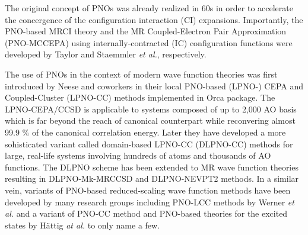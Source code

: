 \documentclass[aip,jcp,amsmath]{revtex4-1}
\begin{document}
%
The original concept of PNOs was already realized in 60s in order to accelerate the concergence of the configuration interaction (CI) expansions.\cite{:/content/aip/journal/jcp/40/12/10.1063/1.1725065,:/content/aip/journal/jcp/48/4/10.1063/1.1668917,:/content/aip/journal/jcp/42/3/10.1063/1.1696050,:/content/aip/journal/jcp/45/5/10.1063/1.1727841,meyer1971ionization,:/content/aip/journal/jcp/58/3/10.1063/1.1679283,meyer1971ionization,Ahlrichs1968_2}
%
Importantly, the PNO-based MRCI theory and the MR Coupled-Electron Pair Approximation (PNO-MCCEPA) using internally-contracted (IC) configuration functions were developed by Taylor\cite{:/content/aip/journal/jcp/74/2/10.1063/1.441186} and Staemmler {\it et al.},\cite{Staemmler1993} respectively.

%
The use of PNOs in the context of modern wave function theories was first introduced by Neese and coworkers in their local PNO-based (LPNO-) CEPA\cite{neeseefficient2009cepa} and Coupled-Cluster (LPNO-CC)\cite{neeseefficient2009,hansenefficient2011,doi:10.1021/ct100445s} methods implemented in Orca package.\cite{WCMS:WCMS1327}
%
The LPNO-CEPA/CCSD is applicable to systems composed of up to 2,000 AO basis which is far beyond the reach of canonical counterpart while reconvering almost 99.9 $\%$ of the canonical correlation energy.
%
Later they have developed a more sohisticated variant called domain-based LPNO-CC (DLPNO-CC) methods for large, real-life systems involving hundreds of atoms and thousands of AO functions.\cite{riplingeran2013,riplingernatural2013,pinskisparse2015,riplingersparse2016,doi:10.1063/1.4981521,dipayan2016}
%
The DLPNO scheme has been extended to MR wave function theories resulting in DLPNO-Mk-MRCCSD\cite{doi:10.1021/acs.jctc.5b00334,doi:10.1021/acs.jctc.7b01184,C8CP03577F} and DLPNO-NEVPT2\cite{:/content/aip/journal/jcp/144/9/10.1063/1.4942769} methods.
%
In a similar vein, variants of PNO-based reduced-scaling wave function methods have been developed by many research groups including PNO-LCC methods by Werner {\it et al.}\cite{doi:10.1021/ct500725e,wernersdecay,doi:10.1021/acs.jctc.7b00554,publ7820099,publ8744633,publ9370681,publ9337428} and a variant of PNO-CC method and PNO-based theories for the excited states by H\"attig {\it at al.}\cite{doi:10.1080/00268976.2013.794314,doi:10.1080/00268976.2016.1263762,doi:10.1063/1.4972001,QUA:QUA24098,C4CP03502J,:/content/aip/journal/jcp/135/7/10.1063/1.3624370,:/content/aip/journal/jcp/135/21/10.1063/1.3664902,:/content/aip/journal/jcp/136/20/10.1063/1.4719981,:/content/aip/journal/jcp/139/8/10.1063/1.4819071} to only name a few.
\end{document}
